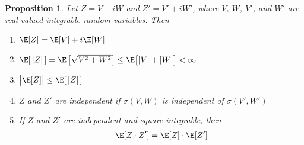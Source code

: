 \documentclass[12pt]{article}
\theoremstyle{plain}
\newtheorem{prop}[thm]{Proposition}
\theoremstyle{definition}
\theoremstyle{remark}
\begin{document}
\begin{prop}
Let $Z = V+iW$ and $Z' = V'+iW'$, where $V$, $W$, $V'$, and $W'$ are
real-valued integrable random variables. Then
\begin{enumerate}[label=\emph{(\roman*)}]
  \item $\E[Z] = \E[V] + i\E[W]$
  \item $\E[\,|Z|\,] = \E\left[\sqrt{V^2 + W^2}\right] \leq
    \E\big[|V|+|W|\big]<\infty$
  \item $\big|\E[Z]\big|\leq \E[\,|Z|\,]$
  \item $Z$ and $Z'$ are independent if $\sigma(V,W)$ is independent of
    $\sigma(V',W')$
  \item If $Z$ and $Z'$ are independent and square integrable, then
    \begin{align*}
      \E[Z\cdot Z'] = \E[Z]\cdot\E[Z']
    \end{align*}
\end{enumerate}
\end{prop}
\end{document}
